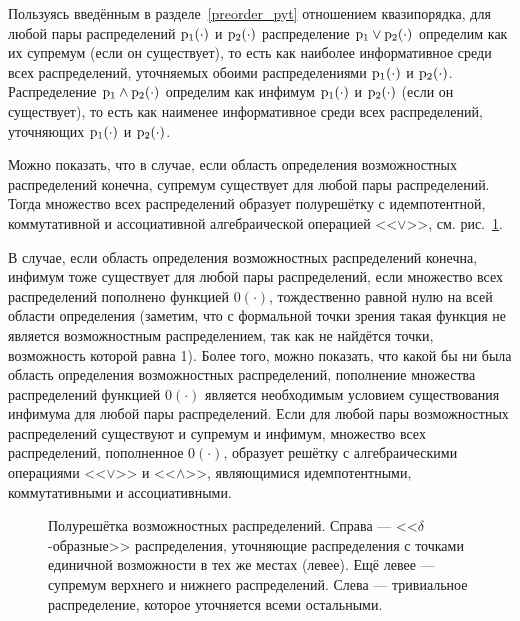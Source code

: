 Пользуясь введённым в разделе~\ref{preorder_pyt} отношением квазипорядка, для любой пары распределений ${\mathrm{p}}_1(\cdot)$ и ${\mathrm{p}}_2(\cdot)$ распределение ${\mathrm{p}}_1\vee{\mathrm{p}}_2(\cdot)$ определим как их супремум (если он существует), то есть как наиболее информативное среди всех распределений, уточняемых обоими распределениями ${\mathrm{p}}_1(\cdot)$ и ${\mathrm{p}}_2(\cdot)$. Распределение ${\mathrm{p}}_1\wedge{\mathrm{p}}_2(\cdot)$ определим как инфимум ${\mathrm{p}}_1(\cdot)$ и ${\mathrm{p}}_2(\cdot)$ (если он существует), то есть как наименее информативное среди всех распределений, уточняющих ${\mathrm{p}}_1(\cdot)$ и ${\mathrm{p}}_2(\cdot)$.

Можно показать, что в случае, если область определения возможностных распределений конечна, супремум существует для любой пары распределений.  Тогда множество всех распределений образует полурешётку с идемпотентной, коммутативной и ассоциативной алгебраической операцией <<$\vee$>>, см. рис.~\ref{ris:half_lattice}. 
\begin{notice}
В случае, если область определения возможностных распределений конечна, инфимум тоже существует для любой пары распределений, если множество всех распределений пополнено функцией $0(\cdot)$, тождественно равной нулю на всей области определения (заметим, что с формальной точки зрения такая функция не является возможностным распределением, так как не найдётся точки, возможность которой равна 1). Более того, можно показать, что какой бы ни была область определения возможностных распределений, пополнение множества распределений функцией $0(\cdot)$ является необходимым условием существования инфимума для любой пары распределений. Если для любой пары возможностных распределений существуют и супремум и инфимум, множество всех распределений, пополненное $0(\cdot)$, образует решётку с алгебраическими операциями <<$\vee$>> и <<$\wedge$>>, являющимися идемпотентными, коммутативными и ассоциативными.
\end{notice}

\begin{figure}[h]
\caption{\small Полурешётка возможностных распределений. Справа --- <<$\delta$-образные>> распределения, уточняющие распределения с точками единичной возможности в тех же местах (левее). Ещё левее --- супремум верхнего и нижнего распределений. Слева --- тривиальное распределение, которое уточняется всеми остальными. }
\label{ris:half_lattice}
\end{figure}

